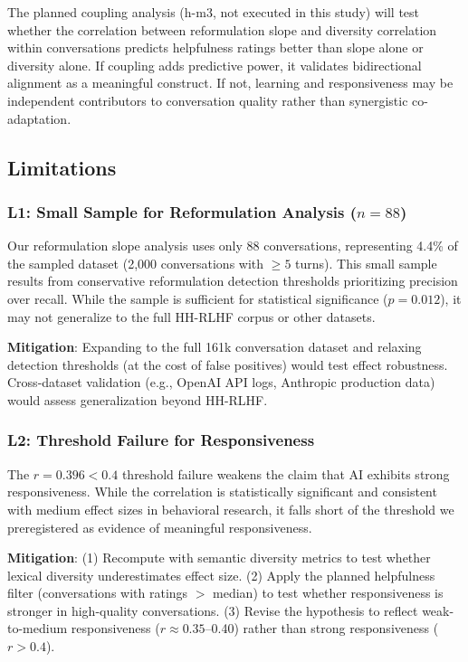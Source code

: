The planned coupling analysis (h-m3, not executed in this study) will test whether the correlation between reformulation slope and diversity correlation within conversations predicts helpfulness ratings better than slope alone or diversity alone. If coupling adds predictive power, it validates bidirectional alignment as a meaningful construct. If not, learning and responsiveness may be independent contributors to conversation quality rather than synergistic co-adaptation.

\subsection{Limitations}

\subsubsection{L1: Small Sample for Reformulation Analysis ($n=88$)}

Our reformulation slope analysis uses only 88 conversations, representing 4.4\% of the sampled dataset (2,000 conversations with $\geq 5$ turns). This small sample results from conservative reformulation detection thresholds prioritizing precision over recall. While the sample is sufficient for statistical significance ($p=0.012$), it may not generalize to the full HH-RLHF corpus or other datasets.

\textbf{Mitigation}: Expanding to the full 161k conversation dataset and relaxing detection thresholds (at the cost of false positives) would test effect robustness. Cross-dataset validation (e.g., OpenAI API logs, Anthropic production data) would assess generalization beyond HH-RLHF.

\subsubsection{L2: Threshold Failure for Responsiveness}

The $r=0.396 < 0.4$ threshold failure weakens the claim that AI exhibits strong responsiveness. While the correlation is statistically significant and consistent with medium effect sizes in behavioral research, it falls short of the threshold we preregistered as evidence of meaningful responsiveness.

\textbf{Mitigation}: (1) Recompute with semantic diversity metrics to test whether lexical diversity underestimates effect size. (2) Apply the planned helpfulness filter (conversations with ratings $>$ median) to test whether responsiveness is stronger in high-quality conversations. (3) Revise the hypothesis to reflect weak-to-medium responsiveness ($r\approx 0.35$--0.40) rather than strong responsiveness ($r>0.4$).

